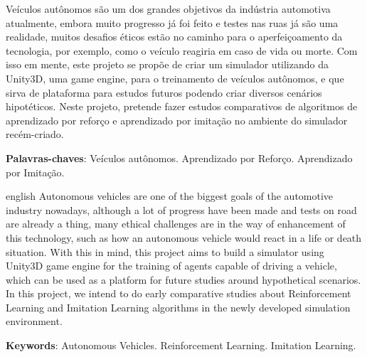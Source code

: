 
\setlength{\absparsep}{18pt} %
\begin{resumo}
Veículos autônomos são um dos grandes objetivos da indústria automotiva atualmente, embora muito progresso já foi feito e testes nas ruas já são uma realidade, muitos desafios éticos estão no caminho para o aperfeiçoamento da tecnologia, por exemplo, como o veículo reagiria em caso de vida ou morte. Com isso em mente, este projeto se propõe de criar um simulador utilizando da Unity3D, uma game engine, para o treinamento de veículos autônomos, e que sirva de plataforma para estudos futuros podendo criar diversos cenários hipotéticos. Neste projeto, pretende fazer estudos comparativos de algoritmos de aprendizado por reforço e aprendizado por imitação no ambiente do simulador recém-criado.

 \textbf{Palavras-chaves}: Veículos autônomos. Aprendizado por Reforço. Aprendizado por Imitação.
\end{resumo}

\begin{resumo}[Abstract]
 \begin{otherlanguage*}{english}
   Autonomous vehicles are one of the biggest goals of the automotive industry nowadays, although a lot of progress have been made and tests on road are already a thing, many ethical challenges are in the way of enhancement of this technology, such as how an autonomous vehicle would react in a life or death situation. With this in mind, this project aims to build a simulator using Unity3D game engine for the training of agents capable of driving a vehicle, which can be used as a platform for future studies around hypothetical scenarios. In this project, we intend to do early comparative studies about Reinforcement Learning and Imitation Learning algorithms in the newly developed simulation environment.

   \vspace{\onelineskip}
 
   \noindent 
   \textbf{Keywords}: Autonomous Vehicles. Reinforcement Learning. Imitation Learning.
 \end{otherlanguage*}
\end{resumo}